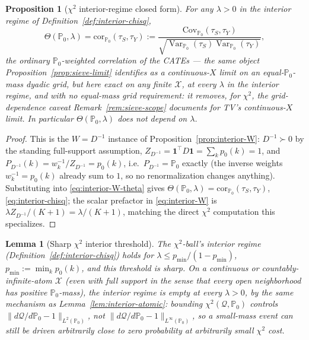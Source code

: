 \documentclass[11pt]{article}
\theoremstyle{plain}
\newtheorem{lemma}[theorem]{Lemma}
\newtheorem{proposition}[theorem]{Proposition}
\theoremstyle{definition}
\theoremstyle{remark}
\newcommand{\PP}{\mathbb{P}}
\newcommand{\cX}{\mathcal{X}}
\newcommand{\Q}{\mathcal{Q}}
\newcommand{\Cov}{\mathrm{Cov}}
\newcommand{\Corr}{\mathrm{cor}}
\DeclareMathOperator{\Var}{Var}
\begin{document}
\begin{proposition}[$\chi^2$ interior-regime closed form]\label{prop:interior-chisq}
For any $\lambda>0$ in the interior regime of Definition~\ref{def:interior-chisq},
\begin{equation}\label{eq:interior-chisq}
    \Theta(\PP_0,\lambda) = \Corr_{\PP_0}(\tau_S,\tau_Y)
    := \frac{\Cov_{\PP_0}(\tau_S,\tau_Y)}{\sqrt{\Var_{\PP_0}(\tau_S)\Var_{\PP_0}(\tau_Y)}},
\end{equation}
the ordinary $\PP_0$-weighted correlation of the CATEs --- the same object
Proposition~\ref{prop:sieve-limit} identifies as a continuous-$X$ \emph{limit} on an
equal-$\PP_0$-mass dyadic grid, but here exact on \emph{any} finite $\cX$, at
\emph{every} $\lambda$ in the interior regime, and with no equal-mass grid
requirement: it removes, for $\chi^2$, the grid-dependence caveat
Remark~\ref{rem:sieve-scope} documents for TV's continuous-$X$ limit. In particular
$\Theta(\PP_0,\lambda)$ does not depend on $\lambda$.
\end{proposition}

\begin{proof}
This is the $W=D^{-1}$ instance of Proposition~\ref{prop:interior-W}: $D^{-1}\succ0$ by
the standing full-support assumption, $Z_{D^{-1}}=\mathbf1^\top D\mathbf1=\sum_kp_0(k)=1$,
and $P_{D^{-1}}(k)=w_k^{-1}/Z_{D^{-1}}=p_0(k)$, i.e.\ $P_{D^{-1}}=\PP_0$ exactly (the
inverse weights $w_k^{-1}=p_0(k)$ already sum to $1$, so no renormalization changes
anything). Substituting into \eqref{eq:interior-W-theta} gives
$\Theta(\PP_0,\lambda)=\Corr_{\PP_0}(\tau_S,\tau_Y)$, \eqref{eq:interior-chisq}; the
scalar prefactor in \eqref{eq:interior-W} is $\lambda Z_{D^{-1}}/(K+1)=\lambda/(K+1)$,
matching the direct $\chi^2$ computation this specializes.
\end{proof}

\begin{lemma}[Sharp $\chi^2$ interior threshold]\label{lem:interior-chisq-threshold}
The $\chi^2$-ball's interior regime (Definition~\ref{def:interior-chisq}) holds for
$\lambda\le p_{\min}/(1-p_{\min})$, $p_{\min}:=\min_kp_0(k)$, and this threshold is
sharp. On a continuous or countably-infinite-atom $\cX$ (even with full support in
the sense that every open neighborhood has positive $\PP_0$-mass), the interior
regime is empty at every $\lambda>0$, by the same mechanism as
Lemma~\ref{lem:interior-atomic}: bounding $\chi^2(\Q,\PP_0)$ controls
$\|d\Q/d\PP_0-1\|_{L^2(\PP_0)}$, not $\|d\Q/d\PP_0-1\|_{L^\infty(\PP_0)}$, so a
small-mass event can still be driven arbitrarily close to zero probability at
arbitrarily small $\chi^2$ cost.
\end{lemma}
\end{document}
